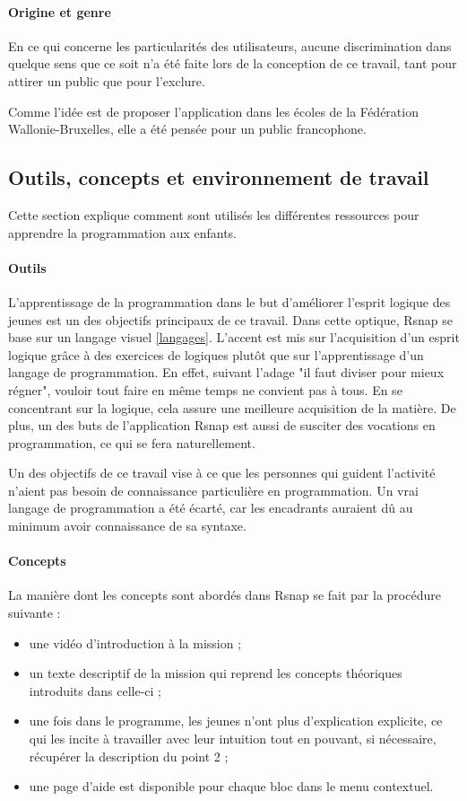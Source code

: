 \paragraph{Origine et genre}
En ce qui concerne les particularités des utilisateurs, aucune discrimination dans quelque sens que ce soit n'a été faite lors de la conception de ce travail, tant pour attirer un public que pour l'exclure. 

Comme l'idée est de proposer l'application dans les écoles de la Fédération Wallonie-Bruxelles, elle a été pensée pour un public francophone. 

\subsection{Outils, concepts et environnement de travail}
Cette section explique comment sont utilisés les différentes ressources pour apprendre la programmation aux enfants.

\paragraph{Outils}
\label{outil}
L'apprentissage de la programmation dans le but d'améliorer l'esprit logique des jeunes est un des objectifs principaux de ce travail. Dans cette optique, Rsnap se base sur un langage visuel \ref{langages}. L'accent est mis sur l'acquisition d'un esprit logique grâce à des exercices de logiques plutôt que sur l'apprentissage d'un langage de programmation.  En effet, suivant l'adage "il faut diviser pour mieux régner", vouloir tout faire en même temps ne convient pas à tous. En se concentrant sur la logique, cela assure une meilleure acquisition de la matière. De plus, un des buts de l'application Rsnap est aussi de susciter des vocations en programmation, ce qui se fera naturellement.

Un des objectifs de ce travail vise à ce que les personnes qui guident l'activité n'aient pas besoin de connaissance particulière en programmation. Un vrai langage de programmation a été écarté, car les encadrants auraient dû au minimum avoir connaissance de sa syntaxe.

\paragraph{Concepts}
La manière dont les concepts sont abordés dans Rsnap se fait par la procédure suivante :
\begin{itemize}
	\item une vidéo d'introduction à la mission ;
	\item un texte descriptif de la mission qui reprend les concepts théoriques introduits dans celle-ci ;
	\item une fois dans le programme, les jeunes n'ont plus d'explication explicite, ce qui les incite à travailler avec leur intuition tout en pouvant, si nécessaire, récupérer la description du point 2 ;
	\item une page d'aide est disponible pour chaque bloc dans le menu contextuel.
\end{itemize}

